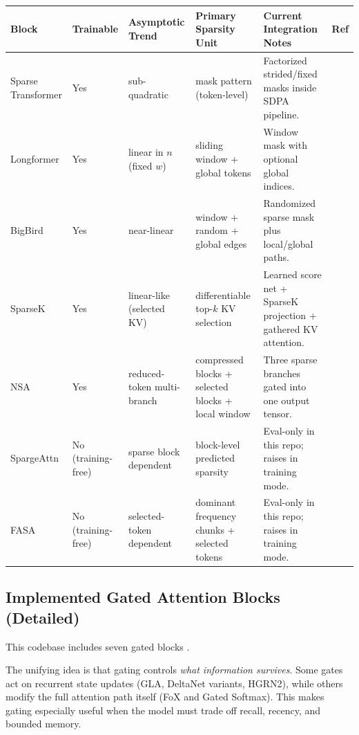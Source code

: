 \documentclass[11pt,a4paper]{article}
\begin{document}
\small
\begin{longtable}{p{2.5cm}p{1.6cm}p{1.9cm}p{2.4cm}p{4.1cm}p{1.5cm}}
\toprule
\textbf{Block} & \textbf{Trainable} & \textbf{Asymptotic Trend} & \textbf{Primary Sparsity Unit} & \textbf{Current Integration Notes} & \textbf{Ref} \\
\midrule
\endhead
Sparse Transformer & Yes & sub-quadratic & mask pattern (token-level) & Factorized strided/fixed masks inside SDPA pipeline. & \citep{child_sparse_transformer_2019} \\
Longformer & Yes & linear in $n$ (fixed $w$) & sliding window + global tokens & Window mask with optional global indices. & \citep{beltagy_longformer_2020} \\
BigBird & Yes & near-linear & window + random + global edges & Randomized sparse mask plus local/global paths. & \citep{zaheer_bigbird_2020} \\
SparseK & Yes & linear-like (selected KV) & differentiable top-$k$ KV selection & Learned score net + SparseK projection + gathered KV attention. & \citep{lou_sparsek_2024} \\
NSA & Yes & reduced-token multi-branch & compressed blocks + selected blocks + local window & Three sparse branches gated into one output tensor. & \citep{yuan_nsa_2025} \\
SpargeAttn & No (training-free) & sparse block dependent & block-level predicted sparsity & Eval-only in this repo; raises in training mode. & \citep{zhang_spargeattn_2025} \\
FASA & No (training-free) & selected-token dependent & dominant frequency chunks + selected tokens & Eval-only in this repo; raises in training mode. & \citep{wang_fasa_2026} \\
\bottomrule
\end{longtable}
\normalsize

\subsection{Implemented Gated Attention Blocks (Detailed)}
This codebase includes seven gated blocks \citep{yang_gla_2023,yang_deltanet_2024,yang_gated_deltanet_2024,sun_retentive_2023,qin_hgrn2_2024,lin_forgetting_transformer_2025,qiu_gated_attention_2025}.

The unifying idea is that gating controls \emph{what information survives}. Some gates act on recurrent state updates (GLA, DeltaNet variants, HGRN2), while others modify the full attention path itself (FoX and Gated Softmax). This makes gating especially useful when the model must trade off recall, recency, and bounded memory.
\end{document}
